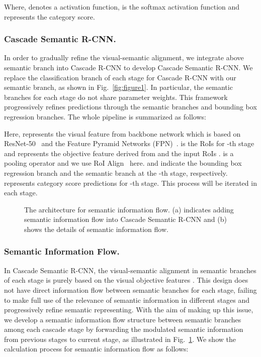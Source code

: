 \documentclass[runningheads]{llncs}
\begin{document}
Where,  denotes a  activation function,  is the softmax activation function and  represents the category score.
\subsubsection{Cascade Semantic R-CNN.\label{Cascade Semantic R-CNN}}
In order to gradually refine the visual-semantic alignment, we integrate above semantic branch into Cascade R-CNN to develop Cascade Semantic R-CNN. We replace the classification branch of each stage for Cascade R-CNN with our semantic branch, as shown in Fig.~\ref{fig:figure1}. In particular, the semantic branches for each stage do not share parameter weights. This framework progressively refines predictions through the semantic branches and bounding box regression branches. The whole pipeline is summarized as follows: 

Here,  represents the visual feature from backbone network which is based on ResNet-50~\cite{he2016deep} and the Feature Pyramid Networks (FPN)~\cite{lin2017feature}. 
 is the RoIs for -th stage and  represents the objective feature derived from  and the input RoIs .  is a pooling operator and we use RoI Align~\cite{maskrcnn} here.  and  indicate the bounding box regression branch and the semantic branch at the -th stage, respectively.  represents category score predictions for -th stage. This process will be iterated in each stage.
\begin{figure}[tbp]
\centering
{}
\caption{The architecture for semantic information flow. (a) indicates adding semantic information flow into Cascade Semantic R-CNN and (b) shows the details of semantic information flow.}
\label{fig:figure2}
\end{figure}
\subsubsection{Semantic Information Flow.}
In Cascade Semantic R-CNN, the visual-semantic alignment in semantic branches of each stage is purely based on the visual objective features . This design does not have direct information flow between semantic branches for each stage, failing to make full use of the relevance of semantic information in different stages and progressively refine semantic representing. With the aim of making up this issue, we develop a semantic information flow structure between semantic branches among each cascade stage by forwarding the modulated semantic information from previous stages to current stage, as illustrated in Fig.~\ref{fig:figure2}. We show the calculation process for semantic information flow as follows:
\end{document}
